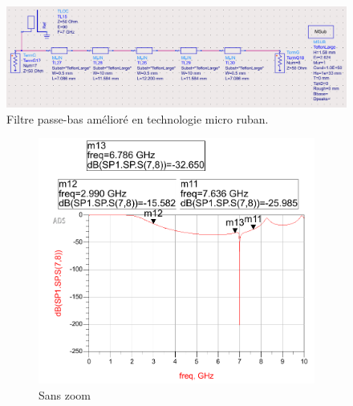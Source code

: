 \documentclass[french]{article}
\begin{document}
\begin{figure}[H]
	\centering
	\includegraphics[width=15cm]{photo/passe_bas_vic/schema_distribue_ameliore_passe_bas_ads.png}
	\caption{Filtre passe-bas amélioré en technologie micro ruban.}
	\label{fig:schema_distribue_ameliore_passe_bas_ads}
\end{figure}


\begin{figure}[H]
	\centering
	\begin{subfigure}[b]{0.49\textwidth}
		\includegraphics[width=\textwidth]{photo/passe_bas_vic/simu_passe_bas_distribue_ameliore.PNG}
		\caption{Sans zoom}
		\label{fig:simu_passe_bas_distribue_ameliore}
	\end{subfigure}
	\begin{subfigure}[b]{0.49\textwidth}

\end{subfigure}
\end{figure}
\end{document}
